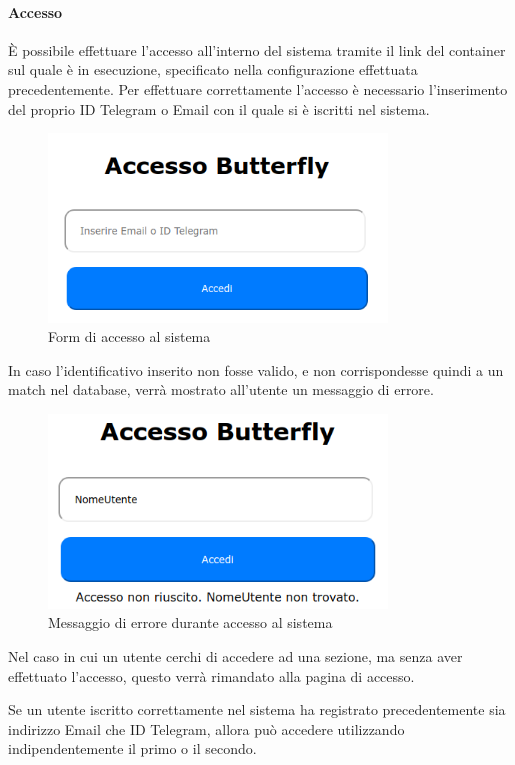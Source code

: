 \paragraph{Accesso}
È possibile effettuare l'accesso all'interno del sistema tramite il link del container sul quale è in esecuzione, specificato nella configurazione effettuata precedentemente.
Per effettuare correttamente l'accesso è necessario l'inserimento del proprio ID Telegram o Email con il quale si è iscritti nel sistema.
\begin{figure}[H]
	\centering
	\includegraphics[width=9cm]{img/accesso_1.png}
	\caption{Form di accesso al sistema}
\end{figure}
In caso l'identificativo inserito non fosse valido, e non corrispondesse quindi a un match nel database, verrà mostrato all'utente un messaggio di errore.
\begin{figure}[H]
	\centering
	\includegraphics[width=9cm]{img/accesso_2.png}
	\caption{Messaggio di errore durante accesso al sistema}
\end{figure}

Nel caso in cui un utente cerchi di accedere ad una sezione, ma senza aver effettuato l'accesso, questo verrà rimandato alla pagina di accesso.\par
Se un utente iscritto correttamente nel sistema ha registrato precedentemente sia indirizzo Email che ID Telegram, allora può accedere utilizzando indipendentemente il primo o il secondo.

